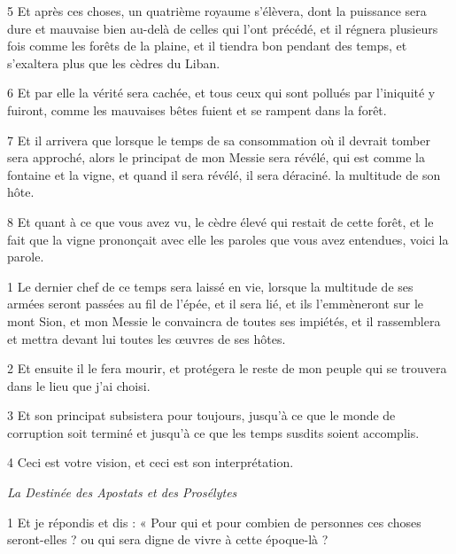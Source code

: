 \par 5 Et après ces choses, un quatrième royaume s'élèvera, dont la puissance sera dure et mauvaise bien au-delà de celles qui l'ont précédé, et il régnera plusieurs fois comme les forêts de la plaine, et il tiendra bon pendant des temps, et s'exaltera plus que les cèdres du Liban.

\par 6 Et par elle la vérité sera cachée, et tous ceux qui sont pollués par l'iniquité y fuiront, comme les mauvaises bêtes fuient et se rampent dans la forêt.

\par 7 Et il arrivera que lorsque le temps de sa consommation où il devrait tomber sera approché, alors le principat de mon Messie sera révélé, qui est comme la fontaine et la vigne, et quand il sera révélé, il sera déraciné. la multitude de son hôte.

\par 8 Et quant à ce que vous avez vu, le cèdre élevé qui restait de cette forêt, et le fait que la vigne prononçait avec elle les paroles que vous avez entendues, voici la parole.


\par 1 Le dernier chef de ce temps sera laissé en vie, lorsque la multitude de ses armées seront passées au fil de l'épée, et il sera lié, et ils l'emmèneront sur le mont Sion, et mon Messie le convaincra de toutes ses impiétés, et il rassemblera et mettra devant lui toutes les œuvres de ses hôtes.

\par 2 Et ensuite il le fera mourir, et protégera le reste de mon peuple qui se trouvera dans le lieu que j'ai choisi.

\par 3 Et son principat subsistera pour toujours, jusqu'à ce que le monde de corruption soit terminé et jusqu'à ce que les temps susdits soient accomplis.

\par 4 Ceci est votre vision, et ceci est son interprétation.



\par \textit{La Destinée des Apostats et des Prosélytes}

\par 1 Et je répondis et dis : « Pour qui et pour combien de personnes ces choses seront-elles ? ou qui sera digne de vivre à cette époque-là ?

